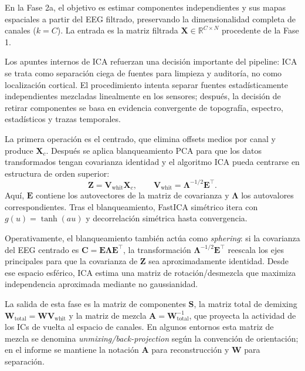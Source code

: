 En la Fase 2a, el objetivo es estimar componentes independientes y sus mapas espaciales a partir del EEG filtrado, preservando la dimensionalidad completa de canales ($k=C$). La entrada es la matriz filtrada $\mathbf{X}\in\mathbb{R}^{C\times N}$ procedente de la Fase 1.

\begin{decisionmetodologica}
\small
Los apuntes internos de ICA refuerzan una decisión importante del pipeline: ICA se trata como separación ciega de fuentes para limpieza y auditoría, no como localización cortical. El procedimiento intenta separar fuentes estadísticamente independientes mezcladas linealmente en los sensores; después, la decisión de retirar componentes se basa en evidencia convergente de topografía, espectro, estadísticos y trazas temporales.
\end{decisionmetodologica}

La primera operación es el centrado, que elimina offsets medios por canal y produce $\mathbf{X}_c$. Después se aplica blanqueamiento PCA para que los datos transformados tengan covarianza identidad y el algoritmo ICA pueda centrarse en estructura de orden superior:
\[
\mathbf{Z}=\mathbf{V}_{\text{whit}}\mathbf{X}_c,\qquad \mathbf{V}_{\text{whit}}=\mathbf{\Lambda}^{-1/2}\mathbf{E}^{\top}.
\]
Aquí, $\mathbf{E}$ contiene los autovectores de la matriz de covarianza y $\mathbf{\Lambda}$ los autovalores correspondientes. Tras el blanqueamiento, FastICA simétrico itera con $g(u)=\tanh(au)$ y decorrelación simétrica hasta convergencia.

Operativamente, el blanqueamiento también actúa como \emph{sphering}: si la covarianza del EEG centrado es $\mathbf{C}=\mathbf{E}\mathbf{\Lambda}\mathbf{E}^{\top}$, la transformación $\mathbf{\Lambda}^{-1/2}\mathbf{E}^{\top}$ reescala los ejes principales para que la covarianza de $\mathbf{Z}$ sea aproximadamente identidad. Desde ese espacio esférico, ICA estima una matriz de rotación/desmezcla que maximiza independencia aproximada mediante no gaussianidad.

La salida de esta fase es la matriz de componentes $\mathbf{S}$, la matriz total de demixing $\mathbf{W}_{\text{total}}=\mathbf{W}\mathbf{V}_{\text{whit}}$ y la matriz de mezcla $\mathbf{A}=\mathbf{W}_{\text{total}}^{-1}$, que proyecta la actividad de los ICs de vuelta al espacio de canales. En algunos entornos esta matriz de mezcla se denomina \emph{unmixing/back-projection} según la convención de orientación; en el informe se mantiene la notación $\mathbf{A}$ para reconstrucción y $\mathbf{W}$ para separación.

